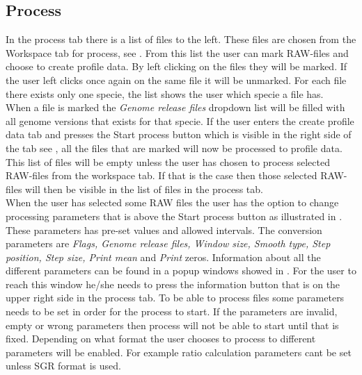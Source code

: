\subsection{Process}
In the process tab there is a list of files to the left. These files are chosen from the Workspace tab for process, see . From this list the user can mark RAW-files and choose to create profile data. By left clicking on the files they will be marked. If the user left clicks once again on the same file it will be unmarked. For each file there exists only one specie, the list shows the user which specie a file has. \\ When a file is marked the \emph{Genome release files} dropdown list will be filled with all genome versions that exists for that specie. If the user enters the create profile data tab and presses the Start process button which is visible in the right side of the tab see , all the files that are marked will now be processed to profile data. This list of files will be empty unless the user has chosen to process selected RAW-files from the workspace tab. If that is the case then those selected RAW-files will then be visible in the list of files in the process tab. \\ When the user has selected some RAW files the user has the option to change processing parameters that is above the Start process button as illustrated in . These parameters has pre-set values and allowed intervals. The conversion parameters are \emph{Flags, Genome release files, Window size, Smooth type, Step position, Step size, Print mean} and \emph{Print} zeros. Information about all the different parameters can be found in a popup windows showed in . For the user to reach this window he/she needs to press the information button that is on the upper right side in the process tab. To be able to process files some parameters needs to be set in order for the process to start. If the parameters are invalid, empty or wrong parameters then process will not be able to start until that is fixed. Depending on what format the user chooses to process to different parameters will be enabled. For example ratio calculation parameters cant be set unless SGR format is used.

